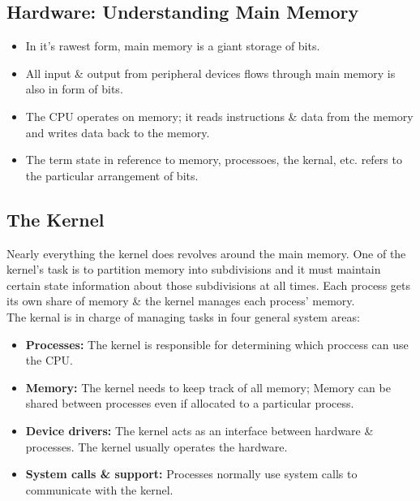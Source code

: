 \documentclass{article}
\begin{document}
	\subsection{Hardware: Understanding Main Memory}
	
	\begin{itemize}

		\item In it's rawest form, main memory is a giant storage of bits.
		\item All input \& output from peripheral devices flows through main memory is also in form of bits.
		\item The CPU operates on memory; it reads instructions \& data from the memory and writes data back to the memory.
		\item The term state in reference to memory, processoes, the kernal, etc. refers to the particular arrangement of bits.

	\end{itemize}

	\subsection{The Kernel}

	Nearly everything the kernel does revolves around the main memory. One of the kernel's task is to partition memory into subdivisions and it must maintain certain state information about those subdivisions at all times. Each process gets its own share of memory \& the kernel manages each process' memory. \\

	The kernal is in charge of managing tasks in four general system areas:
	\begin{itemize}
		\item {\bf Processes:} The kernel is responsible for determining which proccess can use the CPU.
		\item {\bf Memory:} The kernel needs to keep track of all memory; Memory can be shared between processes even if allocated to a particular process.
		\item {\bf Device drivers:} The kernel acts as an interface between hardware \& processes. The kernel usually operates the hardware.
		\item {\bf System calls \& support:} Processes normally use system calls to communicate with the kernel.
	\end{itemize}
	
\end{document}
